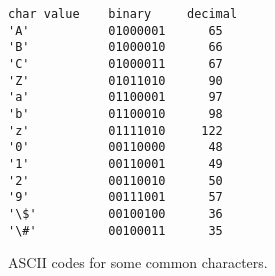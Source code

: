 




\begin {figure}


\begin{verbatim}
char value    binary     decimal
'A'           01000001      65
'B'           01000010      66
'C'           01000011      67
'Z'           01011010      90
'a'           01100001      97
'b'           01100010      98
'z'           01111010     122
'0'           00110000      48
'1'           00110001      49
'2'           00110010      50
'9'           00111001      57
'\$'          00100100      36
'\#'          00100011      35

\end{verbatim}

\caption {ASCII codes for some common characters.}
\label {fig:ascii}

\end {figure}


